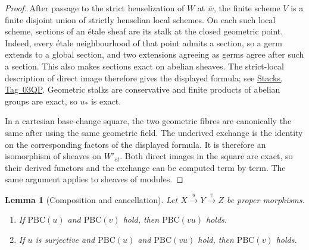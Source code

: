 \documentclass[11pt,a4paper]{article}
\numberwithin{equation}{section}
\newtheorem{lemma}[theorem]{Lemma}
\theoremstyle{definition}
\theoremstyle{remark}
\newcommand{\et}{\acute{e}t}
\newcommand{\stacks}[1]{\href{https://stacks.math.columbia.edu/tag/#1}{\textnormal{Stacks, Tag~#1}}}
\begin{document}
\begin{proof}
After passage to the strict henselization of $W$ at $\bar w$, the finite
scheme $V$ is a finite disjoint union of strictly henselian local schemes.
On each such local scheme, sections of an \'etale sheaf are its stalk at
the closed geometric point. Indeed, every \'etale neighbourhood of that
point admits a section, so a germ extends to a global section, and two
extensions agreeing as germs agree after such a section. This also makes
sections exact on abelian sheaves. The strict-local description of direct
image therefore gives the displayed formula; see \stacks{03QP}.
Geometric stalks are conservative and finite products of abelian groups
are exact, so $u_*$ is exact.

In a cartesian base-change square, the two geometric fibres are
canonically the same after using the same geometric field. The
underived exchange is the identity on the corresponding factors of the
displayed formula. It is therefore an isomorphism of sheaves on
$W'_{\et}$. Both direct images in
the square are exact, so their derived functors and the exchange can be
computed term by term. The same argument applies to sheaves of modules.
\end{proof}

\begin{lemma}[Composition and cancellation]\label{pbc:composition-cancellation}
Let $X\xrightarrow{u}Y\xrightarrow{v}Z$ be proper morphisms.
\begin{enumerate}[label=(\roman*)]
\item If $\mathrm{PBC}(u)$ and $\mathrm{PBC}(v)$ hold, then
      $\mathrm{PBC}(vu)$ holds.
\item If $u$ is surjective and $\mathrm{PBC}(u)$ and
      $\mathrm{PBC}(vu)$ hold, then $\mathrm{PBC}(v)$ holds.
\end{enumerate}
\end{lemma}
\end{document}

